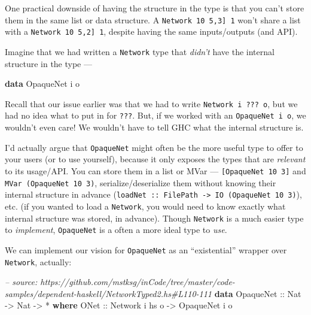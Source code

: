 \documentclass[]{article}
\newenvironment{Shaded}{}{}
\newcommand{\KeywordTok}[1]{\textcolor[rgb]{0.00,0.44,0.13}{\textbf{{#1}}}}
\newcommand{\DataTypeTok}[1]{\textcolor[rgb]{0.56,0.13,0.00}{{#1}}}
\newcommand{\CommentTok}[1]{\textcolor[rgb]{0.38,0.63,0.69}{\textit{{#1}}}}
\newcommand{\OtherTok}[1]{\textcolor[rgb]{0.00,0.44,0.13}{{#1}}}
\newcommand{\FunctionTok}[1]{\textcolor[rgb]{0.02,0.16,0.49}{{#1}}}
\newcommand{\NormalTok}[1]{{#1}}
\begin{document}
One practical downside of having the structure in the type is that you can't
store them in the same list or data structure. A
\texttt{Network\ 10\ \textquotesingle{}{[}5,3{]}\ 1} won't share a list with a
\texttt{Network\ 10\ \textquotesingle{}{[}5,2{]}\ 1}, despite having the same
inputs/outputs (and API).

Imagine that we had written a \texttt{Network} type that \emph{didn't} have the
internal structure in the type ---

\begin{Shaded}
\begin{Highlighting}[]
\KeywordTok{data} \DataTypeTok{OpaqueNet} \NormalTok{i o}
\end{Highlighting}
\end{Shaded}

Recall that our issue earlier was that we had to write
\texttt{Network\ i\ ???\ o}, but we had no idea what to put in for \texttt{???}.
But, if we worked with an \texttt{OpaqueNet\ i\ o}, we wouldn't even care! We
wouldn't have to tell GHC what the internal structure is.

I'd actually argue that \texttt{OpaqueNet} might often be the more useful type
to offer to your users (or to use yourself), because it only exposes the types
that are \emph{relevant} to its usage/API. You can store them in a list or MVar
--- \texttt{{[}OpaqueNet\ 10\ 3{]}} and \texttt{MVar\ (OpaqueNet\ 10\ 3)},
serialize/deserialize them without knowing their internal structure in advance
(\texttt{loadNet\ ::\ FilePath\ -\textgreater{}\ IO\ (OpaqueNet\ 10\ 3)}), etc.
(if you wanted to load a \texttt{Network}, you would need to know exactly what
internal structure was stored, in advance). Though \texttt{Network} is a much
easier type to \emph{implement}, \texttt{OpaqueNet} is a often a more ideal type
to \emph{use}.

We can implement our vision for \texttt{OpaqueNet} as an ``existential'' wrapper
over \texttt{Network}, actually:

\begin{Shaded}
\begin{Highlighting}[]
\CommentTok{-- source: https://github.com/mstksg/inCode/tree/master/code-samples/dependent-haskell/NetworkTyped2.hs#L110-111}
\KeywordTok{data} \DataTypeTok{OpaqueNet}\OtherTok{ ::} \DataTypeTok{Nat} \OtherTok{->} \DataTypeTok{Nat} \OtherTok{->} \FunctionTok{*} \KeywordTok{where}
    \DataTypeTok{ONet}\OtherTok{ ::} \DataTypeTok{Network} \NormalTok{i hs o }\OtherTok{->} \DataTypeTok{OpaqueNet} \NormalTok{i o}
\end{Highlighting}
\end{Shaded}
\end{document}
